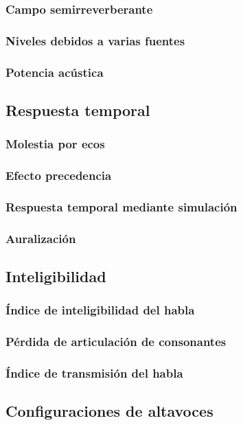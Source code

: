 \documentclass[a4paper, 8pt]{extarticle}
\begin{document}
\begin{multicols}{3}
  \subsubsection{Campo semirreverberante}
  \subsubsection{Niveles debidos a varias fuentes}
  \subsubsection{Potencia acústica}

  \subsection{Respuesta temporal}
  \subsubsection{Molestia por ecos}
  \subsubsection{Efecto precedencia}
  \subsubsection{Respuesta temporal mediante simulación}
  \subsubsection{Auralización}

  \subsection{Inteligibilidad}
  \subsubsection{Índice de inteligibilidad del habla}
  \subsubsection{Pérdida de articulación de consonantes}
  \subsubsection{Índice de transmisión del habla}

  \subsection{Configuraciones de altavoces}

\end{multicols}
\end{document}
